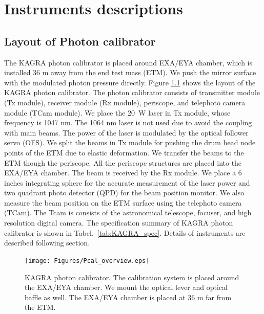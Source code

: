 
\chapter{Instruments descriptions} %

\label{Chapter3} %




\section{Layout of Photon calibrator}
The KAGRA photon calibrator is placed around EXA/EYA chamber, which is installed 36 m away from the end test mass (ETM). We push the mirror surface with the modulated photon pressure directly. Figure \ref{fig:Pcal_overview} shows the layout of the KAGRA photon calibrator. The photon calibrator consists of transmitter module (Tx module), receiver module (Rx module), periscope, and telephoto camera module (TCam module). We place the 20~W laser in Tx module, whose frequency is 1047 nm. The 1064 nm laser is not used due to avoid the coupling with main beams.   The power of the laser is modulated by the optical follower servo (OFS). We split the beams in Tx module for pushing the drum head node points of the ETM due to elastic deformation. We transfer the beams to the ETM though the periscope. All the periscope structures are placed into the EXA/EYA chamber. The beam is received by the Rx module. We place a 6 inches integrating sphere for the accurate measurement of the laser power and two quadrant photo detector (QPD) for the beam position monitor. We also measure the beam position on the ETM surface using the telephoto camera (TCam). The Tcam is consists of the astronomical telescope, focuser, and high resolution digital camera. The specification summary of KAGRA photon calibrator is shown in Tabel.~\ref{tab:KAGRA_spec}. Details of instruments are described following section.
\begin{figure}
\begin{center}
\texttt{[image: Figures/Pcal\_overview.eps]}
\caption{KAGRA photon calibrator. The calibration system is placed around the EXA/EYA chamber. We mount the optical lever and optical baffle as well. The EXA/EYA chamber is placed at 36 m far from the ETM.} 
\label{fig:Pcal_overview} 
\end{center}
\end{figure}

